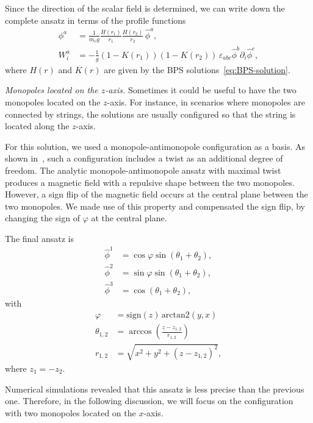 \documentclass[aps, prd, twocolumn, superscriptaddress, preprintnumbers, nofootinbib, longbibliography]{revtex4-1}
\begin{document}
Since the direction of the scalar field is determined, we can write down the complete ansatz in terms of the profile functions
\begin{align}
    \phi^a&=\frac{1}{m_v g}\frac{H(r_1)}{r_1}\frac{H(r_2)}{r_2}\, \hat{\phi}^a,\\
    W^a_i&=-\frac{1}{g}(1-K(r_1))(1-K(r_2))\, \varepsilon_{abc} \hat{\phi}^b \partial_i \hat{\phi}^c,
\end{align}
where $H(r)$ and $K(r)$ are given by the BPS solutions~\eqref{eq:BPS-solution}.


\textit{Monopoles located on the $z$-axis.}
Sometimes it could be useful to have the two monopoles located on the $z$-axis. For instance, in scenarios where monopoles are connected by strings, the solutions are usually configured so that the string is located along the $z$-axis.


For this solution, we used a monopole-antimonopole configuration as a basis. As shown in~\cite{Saurabh:2017ryg}, such a configuration includes a twist as an additional degree of freedom. The analytic monopole-antimonopole ansatz with maximal twist produces a magnetic field with a repulsive shape between the two monopoles. However, a sign flip of the magnetic field occurs at the central plane between the two monopoles. We made use of this property and compensated the sign flip, by changing the sign of $\varphi$ at the central plane.

The final ansatz is
\begin{align}
    \hat{\phi}^1&=\cos{\varphi}\sin{(\theta_1 + \theta_2)},\nonumber\\
    \hat{\phi}^2&=\sin{\varphi}\sin{(\theta_1 + \theta_2)},\nonumber\\
    \hat{\phi}^3&=\cos{(\theta_1 + \theta_2)},
\end{align}
with
\begin{align*}
    \varphi&=\text{sign}(z)\, \text{arctan2}(y,x)\\
    \theta_{1,2}&=\arccos{\left(\frac{z-z_{1,2}}{r_{1,2}}\right)}\\
    r_{1,2}&=\sqrt{x^2+y^2+(z-z_{1,2})^2},
\end{align*}
where $z_1=-z_2$.

Numerical simulations revealed that this ansatz is less precise than the previous one. Therefore, in the following discussion, we will focus on the configuration with two monopoles located on the $x$-axis.
\end{document}
